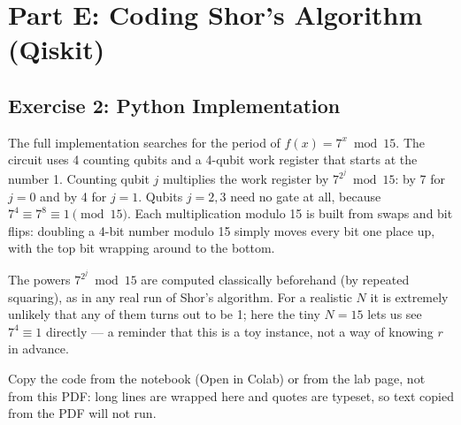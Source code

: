 \documentclass[a4paper,11pt]{article}
\begin{document}
\section{Part E: Coding Shor's Algorithm (Qiskit)}

\subsection{Exercise 2: Python Implementation}

The full implementation searches for the period of $f(x) = 7^x \bmod 15$.
The circuit uses 4 counting qubits and a 4-qubit work register that starts at the number 1. Counting qubit $j$ multiplies the work register by $7^{2^j} \bmod 15$: by 7 for $j=0$ and by 4 for $j=1$. Qubits $j=2,3$ need no gate at all, because $7^4 \equiv 7^8 \equiv 1 \pmod{15}$. Each multiplication modulo 15 is built from swaps and bit flips: doubling a 4-bit number modulo 15 simply moves every bit one place up, with the top bit wrapping around to the bottom.

The powers $7^{2^j} \bmod 15$ are computed classically beforehand (by repeated squaring), as in any real run of Shor's algorithm. For a realistic $N$ it is extremely unlikely that any of them turns out to be 1; here the tiny $N = 15$ lets us see $7^4 \equiv 1$ directly — a reminder that this is a toy instance, not a way of knowing $r$ in advance.

Copy the code from the notebook (Open in Colab) or from the lab page, not from this PDF:
long lines are wrapped here and quotes are typeset, so text copied from the PDF will not run.
\end{document}
